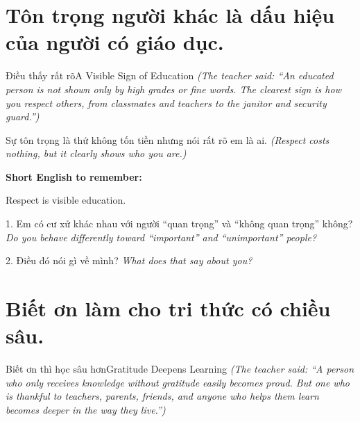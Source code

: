 \section{Tôn trọng người khác là dấu hiệu của người có giáo dục.}
\begin{truyen}{Điều thấy rất rõ}{A Visible Sign of Education}
\textit{(The teacher said: ``An educated person is not shown only by high grades or fine words. The clearest sign is how you respect others, from classmates and teachers to the janitor and security guard.'')}
\end{truyen}

\begin{baihoc}
Sự tôn trọng là thứ không tốn tiền nhưng nói rất rõ em là ai.
\textit{(Respect costs nothing, but it clearly shows who you are.)}
\end{baihoc}

\begin{ghinhoanh}
\textbf{Short English to remember:}

Respect is visible education.

\end{ghinhoanh}

\begin{tuhocnhanh}
1. Em có cư xử khác nhau với người “quan trọng” và “không quan trọng” không? \textit{Do you behave differently toward “important” and “unimportant” people?}

2. Điều đó nói gì về mình? \textit{What does that say about you?}
\end{tuhocnhanh}
\ngancach

\section{Biết ơn làm cho tri thức có chiều sâu.}
\begin{truyen}{Biết ơn thì học sâu hơn}{Gratitude Deepens Learning}
\textit{(The teacher said: ``A person who only receives knowledge without gratitude easily becomes proud. But one who is thankful to teachers, parents, friends, and anyone who helps them learn becomes deeper in the way they live.'')}
\end{truyen}

